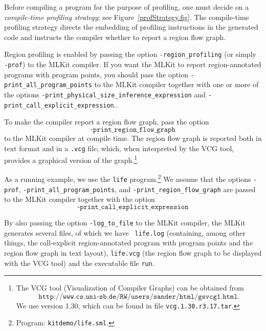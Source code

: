\documentclass[12pt]{book}
\begin{document}
Before compiling a program for the purpose of profiling, one must decide on a
%
{\em compile-time profiling strategy}; see
Figure~\ref{profStrategy.fig}.  The compile-time profiling strategy
directs the embedding of profiling instructions in the generated code
and instructs the compiler whether to report a region flow graph.

Region profiling is enabled by passing the option 
%
\texttt{-region\_profiling} (or simply \texttt{-prof}) to the MLKit
compiler. If you want the MLKit to report region-annotated programs
with program points, you should pass the option
%
\texttt{-print\_all\_program\_points}
to the MLKit compiler together with one or more of the options
%
\texttt{-print\_physical\_size\_inference\_expression} and
%
\texttt{-print\_call\_explicit\_expression}..

To make the compiler report a region flow graph, pass the option
%
$$\texttt{-print\_region\_flow\_graph}$$ 
to the MLKit compiler at compile
time. The region flow graph is reported both in text format and in a
{\tt .vcg} file, which, when interpreted by the
%
VCG tool, provides a graphical version of the graph.\footnote{The VCG
  tool (Visualization of Compiler Graphs) can be obtained from
  \[\texttt{http://www.cs.uni-sb.de/RW/users/sander/html/gsvcg1.html}.\]
  We use version 1.30, which can be found in file
  \texttt{vcg.1.30.r3.17.tar}.}

As a running example, we use the 
%
{\tt life} program.\footnote{Program: \texttt{kitdemo/life.sml}.}  We
assume that the options \texttt{-prof},
\texttt{-print\_all\_program\_points}, and
\texttt{-print\_region\_flow\_graph} are passed to the MLKit compiler
together with the option $$\texttt{-print\_call\_explicit\_expression}$$

By also passing the option \texttt{-log\_to\_file} to the MLKit
compiler, the MLKit generates several files, of which we have {\tt
  life.log} (containing, among other things, the call-explicit
region-annotated program with program points and the region flow graph
in text layout), {\tt life.vcg} (the region flow graph to be displayed
with the VCG tool) and the executable file {\tt run}.
\end{document}

